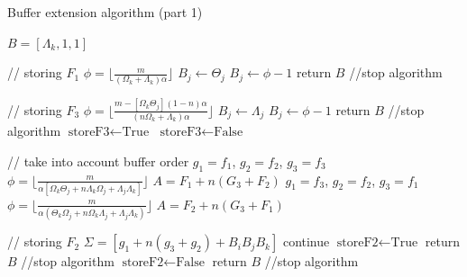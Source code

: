 \documentclass[conference]{IEEEtran}
\begin{document}
\begin{algorithm}[h]
  \caption{Buffer extension algorithm (part 1)}

  \begin{algorithmic}[1]
    \STATE $B = [\Lambda_k, 1, 1]$

    \STATE // storing $F_1$
    \STATE $ \phi = \lfloor \frac{m}{(\Omega_k + \Lambda_k)\alpha} \rfloor $
      \STATE $B_j \leftarrow \Theta_j$
    \ELSE
      \STATE $B_j \leftarrow \phi - 1$
      \STATE return $B$ //stop algorithm
    \ENDIF

    \STATE // storing $F_3$
    \STATE $ \phi = \lfloor \frac{m - [\Omega_k \Theta_j](1-n)\alpha}{(n\Omega_k + \Lambda_k)\alpha} \rfloor $
      \STATE $B_j \leftarrow \Lambda_j$
    \ELSE
      \STATE $B_j \leftarrow \phi - 1$
      \STATE return $B$ //stop algorithm
    \ENDIF
      \STATE $\textrm{storeF3} \leftarrow \textrm{True}$
    \ELSE
      \STATE $\textrm{storeF3} \leftarrow \textrm{False}$
    \ENDIF

    \STATE // take into account buffer order
      \STATE $g_1 = f_1$, $g_2 = f_2$, $g_3 = f_3$
      \STATE $\phi = \lfloor \frac{m}{\alpha[\Omega_k \Theta_j + n \Lambda_k \Omega_j + \Lambda_j \Lambda_k]} \rfloor$
      \STATE $A = F_1 + n(G_3 + F_2)$
    \ELSE
      \STATE $g_1 = f_3$, $g_2 = f_2$, $g_3 = f_1$
      \STATE $\phi = \lfloor \frac{m}{\alpha (\Theta_k \Omega_j + n\Omega_k\Lambda_j + \Lambda_j \Lambda_k)} \rfloor$
      \STATE $A = F_2 + n(G_3 + F_1)$
    \ENDIF

    \STATE // storing $F_2$
    \STATE $\Sigma = [g_1 + n(g_3 + g_2) + B_iB_jB_k]$
      \STATE continue
      \STATE $\textrm{storeF2} \leftarrow \textrm{True}$
      \STATE return $B$ //stop algorithm
    \ELSE
      \STATE $\textrm{storeF2} \leftarrow \textrm{False}$
      \STATE return $B$ //stop algorithm
    \ENDIF

  \end{algorithmic}
  \label{algo:buffer_extension_1}
\end{algorithm}
\end{document}
